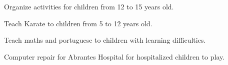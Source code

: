 \documentclass[10pt,a4paper,ragged2e,withhyper]{altacv}
\begin{document}
\begin{paracol}{2}

\small Organize activities for children from 12 to 15 years old.

\divider

\small Teach Karate to children from 5 to 12 years old.

\divider

\small Teach maths and portuguese to children with learning difficulties.

\divider

\small Computer repair for Abrantes Hospital for hospitalized children to play.



\end{paracol}


\end{document}
